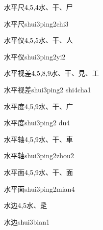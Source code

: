 \begin{Entry}{水平尺}{4,5,4}{⽔、⼲、⼫}
  \begin{Phonetics}{水平尺}{shui3ping2chi3}
  \end{Phonetics}
\end{Entry}

\begin{Entry}{水平仪}{4,5,5}{⽔、⼲、⼈}
  \begin{Phonetics}{水平仪}{shui3ping2yi2}
  \end{Phonetics}
\end{Entry}

\begin{Entry}{水平视差}{4,5,8,9}{⽔、⼲、⾒、⼯}
  \begin{Phonetics}{水平视差}{shui3ping2 shi4cha1}
  \end{Phonetics}
\end{Entry}

\begin{Entry}{水平度}{4,5,9}{⽔、⼲、⼴}
  \begin{Phonetics}{水平度}{shui3ping2 du4}
  \end{Phonetics}
\end{Entry}

\begin{Entry}{水平轴}{4,5,9}{⽔、⼲、⾞}
  \begin{Phonetics}{水平轴}{shui3ping2zhou2}
  \end{Phonetics}
\end{Entry}

\begin{Entry}{水平面}{4,5,9}{⽔、⼲、⾯}
  \begin{Phonetics}{水平面}{shui3ping2mian4}
  \end{Phonetics}
\end{Entry}

\begin{Entry}{水边}{4,5}{⽔、⾡}
  \begin{Phonetics}{水边}{shui3bian1}
  \end{Phonetics}
\end{Entry}

